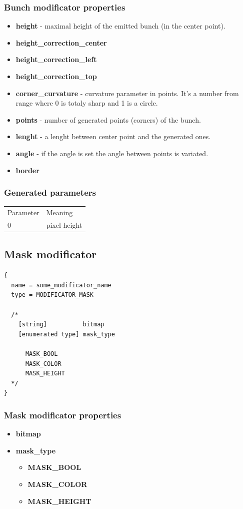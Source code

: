 \documentclass[9pt]{article}
\begin{document}
\subsubsection*{Bunch modificator properties}
\begin{itemize}
\item{\bf height} - maximal height of the emitted bunch (in the center point).
\item{\bf height\_correction\_center}
\item{\bf height\_correction\_left}
\item{\bf height\_correction\_top}
\item{\bf corner\_curvature} - curvature parameter in points. It's a number 
from \begin{math}<0,1>\end{math} range where 0 is totaly sharp and 1 is a circle.
\item{\bf points} - number of generated points (corners) of the bunch.
\item{\bf lenght} - a lenght between center point and the generated ones.
\item{\bf angle} - if the angle is set the angle between points is variated.
\item{\bf border}
\end{itemize}
\subsubsection*{Generated parameters}
\begin{tabular}{|l||l|}
  Parameter & Meaning \\
  0 & pixel height \\
\end{tabular}

\subsection{Mask modificator}

\begin{verbatim}
{
  name = some_modificator_name
  type = MODIFICATOR_MASK

  /*
    [string]          bitmap
    [enumerated type] mask_type
  
      MASK_BOOL
      MASK_COLOR
      MASK_HEIGHT
  */
}
\end{verbatim}
\subsubsection*{Mask modificator properties}
\begin{itemize}
\item{\bf bitmap}
\item{\bf mask\_type}
\begin{itemize}
\item{\bf MASK\_BOOL}
\item{\bf MASK\_COLOR}
\item{\bf MASK\_HEIGHT}
\end{itemize}
\end{itemize}
\end{document}
